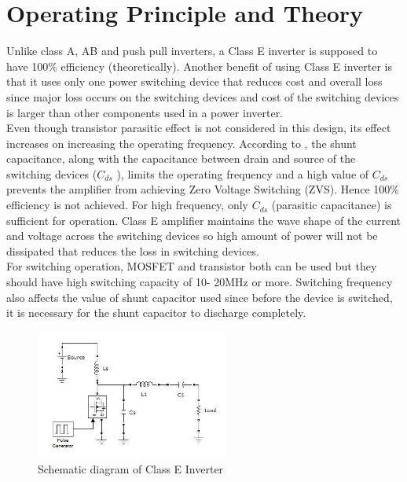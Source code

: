 \documentclass[journal,twoside]{IEEEtran}
\begin{document}
\section{Operating Principle and Theory}
Unlike class A, AB and push pull inverters, a Class E inverter
is supposed to have 100\% efficiency (theoretically). Another
benefit of using Class E inverter is that it uses only one power
switching device that reduces cost and overall loss since
major loss occurs on the switching devices and cost of the
switching devices is larger than other components used in a
power inverter.\\

Even though transistor parasitic effect is not considered in this
design, its effect increases on increasing the operating
frequency. According to \cite{Sokal2001}, the shunt capacitance, along with
the capacitance between drain and source of the switching
devices ($C_{ds}$ ), limits the operating frequency and a high value
of $C_{ds}$ prevents the amplifier from achieving Zero Voltage
Switching (ZVS). Hence 100\% efficiency is not achieved. For
high frequency, only $C_{ds}$ (parasitic capacitance) is sufficient
for operation. Class E amplifier maintains the wave shape of
the current and voltage across the switching devices so high
amount of power will not be dissipated that reduces the loss in
switching devices.\\
For switching operation, MOSFET and transistor both can be
used but they should have high switching capacity of 10-
20MHz or more. Switching frequency also affects the value
of shunt capacitor used since before the device is switched, it
is necessary for the shunt capacitor to discharge completely.\\

\begin{figure}[!ht]
\centering
\includegraphics[width=2.5in]{1}
\caption{Schematic diagram of Class E Inverter}
\label{fig_1}
\end{figure}
\end{document}
